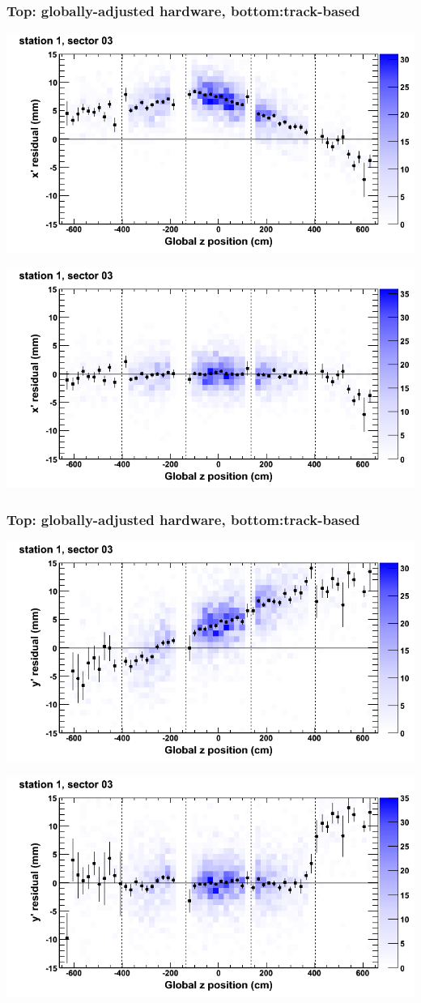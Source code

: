 \documentclass[compress]{beamer}
\begin{document}
\begin{frame}
\frametitle{Top: globally-adjusted hardware, bottom:track-based}
\includegraphics[width=0.7\linewidth]{NOV4_mapplots_HW/DTvsz_st1sec03_x.png}

\includegraphics[width=0.7\linewidth]{NOV4_mapplots/DTvsz_st1sec03_x.png}
\end{frame}

\begin{frame}
\frametitle{Top: globally-adjusted hardware, bottom:track-based}
\includegraphics[width=0.7\linewidth]{NOV4_mapplots_HW/DTvsz_st1sec03_y.png}

\includegraphics[width=0.7\linewidth]{NOV4_mapplots/DTvsz_st1sec03_y.png}
\end{frame}
\end{document}
